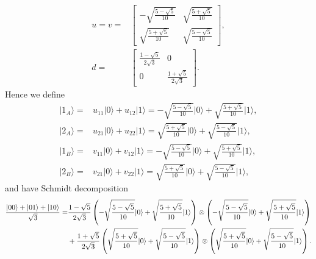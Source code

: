 \documentclass[en]{sol-man}
\begin{document}
\begin{pf}
\begin{align}
        u=v=&\left[\begin{matrix}
            -\sqrt{\frac{5-\sqrt{5}}{10}}&\sqrt{\frac{5+\sqrt{5}}{10}}\\
            \sqrt{\frac{5+\sqrt{5}}{10}}&\sqrt{\frac{5-\sqrt{5}}{10}}
        \end{matrix}\right],\\
        d=&\left[\begin{matrix}
            \frac{1-\sqrt{5}}{2\sqrt{3}}&0\\
            0&\frac{1+\sqrt{5}}{2\sqrt{3}}
        \end{matrix}\right].
    \end{align}
    Hence we define
    \begin{align}
        \lvert 1_A\rangle=&u_{11}\lvert 0\rangle+u_{12}\lvert 1\rangle=-\sqrt{\frac{5-\sqrt{5}}{10}}\lvert 0\rangle+\sqrt{\frac{5+\sqrt{5}}{10}}\lvert 1\rangle,\\
        \lvert 2_A\rangle=&u_{21}\lvert 0\rangle+u_{22}\lvert 1\rangle=\sqrt{\frac{5+\sqrt{5}}{10}}\lvert 0\rangle+\sqrt{\frac{5-\sqrt{5}}{10}}\lvert 1\rangle,\\
        \lvert 1_B\rangle=&v_{11}\lvert 0\rangle+v_{12}\lvert 1\rangle=-\sqrt{\frac{5-\sqrt{5}}{10}}\lvert 0\rangle+\sqrt{\frac{5+\sqrt{5}}{10}}\lvert 1\rangle,\\
        \lvert 2_B\rangle=&v_{21}\lvert 0\rangle+v_{22}\lvert 1\rangle=\sqrt{\frac{5+\sqrt{5}}{10}}\lvert 0\rangle+\sqrt{\frac{5-\sqrt{5}}{10}}\lvert 1\rangle,
    \end{align}
    and have Schmidt decomposition
    \begin{align}
        \notag\frac{\lvert 00\rangle+\lvert 01\rangle+\lvert 10\rangle}{\sqrt{3}}=&\frac{1-\sqrt{5}}{2\sqrt{3}}\left(-\sqrt{\frac{5-\sqrt{5}}{10}}\lvert 0\rangle+\sqrt{\frac{5+\sqrt{5}}{10}}\lvert 1\rangle\right)\otimes\left(-\sqrt{\frac{5-\sqrt{5}}{10}}\lvert 0\rangle+\sqrt{\frac{5+\sqrt{5}}{10}}\lvert 1\rangle\right)\\
        &+\frac{1+\sqrt{5}}{2\sqrt{3}}\left(\sqrt{\frac{5+\sqrt{5}}{10}}\lvert 0\rangle+\sqrt{\frac{5-\sqrt{5}}{10}}\lvert 1\rangle\right)\otimes\left(\sqrt{\frac{5+\sqrt{5}}{10}}\lvert 0\rangle+\sqrt{\frac{5-\sqrt{5}}{10}}\lvert 1\rangle\right).
    \end{align}
\end{pf}

\ifx\allfiles\undefined


\end{document}
